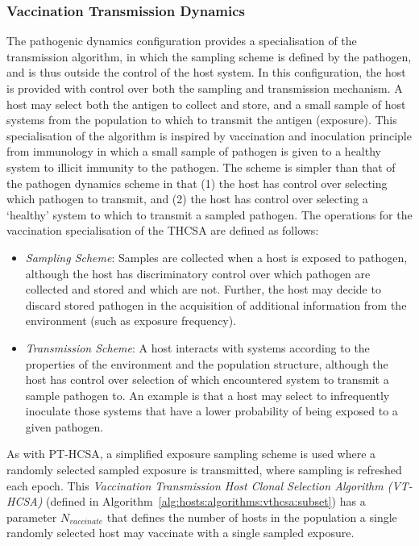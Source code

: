 \subsubsection{Vaccination Transmission Dynamics}
The pathogenic dynamics configuration provides a specialisation of the transmission algorithm, in which the sampling scheme is defined by the pathogen, and is thus outside the control of the host system. In this configuration, the host is provided with control over both the sampling and transmission mechanism. A host may select both the antigen to collect and store, and a small sample of host systems from the population to which to transmit the antigen (exposure). This specialisation of the algorithm is inspired by vaccination and inoculation principle from immunology in which a small sample of pathogen is given to a healthy system to illicit immunity to the pathogen. The scheme is simpler than that of the pathogen dynamics scheme in that (1) the host has control over selecting which pathogen to transmit, and (2) the host has control over selecting a `healthy' system to which to transmit a sampled pathogen. The operations for the vaccination specialisation of the THCSA are defined as follows:

\begin{itemize}
	\item \emph{Sampling Scheme}: Samples are collected when a host is exposed to pathogen, although the host has discriminatory control over which pathogen are collected and stored and which are not. Further, the host may decide to discard stored pathogen in the acquisition of additional information from the environment (such as exposure frequency). 
	\item \emph{Transmission Scheme}: A host interacts with systems according to the properties of the environment and the population structure, although the host has control over selection of which encountered system to transmit a sample pathogen to. An example is that a host may select to infrequently inoculate those systems that have a lower probability of being exposed to a given pathogen.
\end{itemize}

As with PT-HCSA, a simplified exposure sampling scheme is used where a randomly selected sampled exposure is transmitted, where sampling is refreshed each epoch. This \emph{Vaccination Transmission Host Clonal Selection Algorithm (VT-HCSA)} (defined in Algorithm~\ref{alg:hosts:algorithms:vthcsa:subset}) has a parameter $N_{vaccinate}$ that defines the number of hosts in the population a single randomly selected host may vaccinate with a single sampled exposure.

